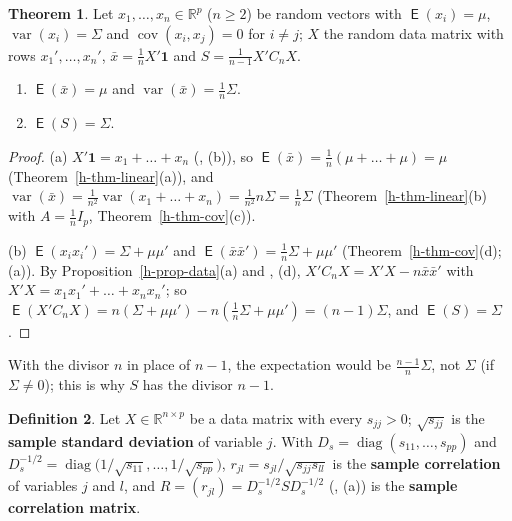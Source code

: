\documentclass[12pt]{article}
\newcommand{\R}{\mathbb R}
\newcommand{\one}{\mathbf 1}
\DeclareMathOperator{\diag}{diag}
\DeclareMathOperator\expc{\mathsf{E}}
\DeclareMathOperator\var{var}
\DeclareMathOperator\cov{cov}
\theoremstyle{definition}
\newtheorem{theorem}{Theorem}
\newtheorem{definition}[theorem]{Definition}
\begin{document}
\begin{theorem}\label{h-thm-sample}
Let \(x_1,\dots,x_n\in\R^p\) (\(n\geqslant2\)) be random vectors with \(\expc(x_i)=\mu\),
\(\var(x_i)=\Sigma\) and \(\cov(x_i,x_j)=0\) for \(i\ne j\); \(X\) the random data matrix with
rows \(x_1',\dots,x_n'\), \(\bar x=\frac1nX'\one\) and \(S=\frac1{n-1}X'C_nX\).
\begin{enumerate}
\item \(\expc(\bar x)=\mu\) and \(\var(\bar x)=\frac1n\Sigma\).
\item \(\expc(S)=\Sigma\).
\end{enumerate}
\end{theorem}
\begin{proof}
(a) \(X'\one=x_1+\dots+x_n\) (, (b)), so \(\expc(\bar x)=\frac1n(\mu+\dots+\mu)=\mu\)
(Theorem~\ref{h-thm-linear}(a)), and \(\var(\bar x)=\frac1{n^2}\var(x_1+\dots+x_n)
=\frac1{n^2}n\Sigma=\frac1n\Sigma\) (Theorem~\ref{h-thm-linear}(b) with \(A=\frac1nI_p\), Theorem~\ref{h-thm-cov}(c)).

(b) \(\expc(x_ix_i')=\Sigma+\mu\mu'\) and \(\expc(\bar x\bar x')=\frac1n\Sigma+\mu\mu'\)
(Theorem~\ref{h-thm-cov}(d); (a)). By Proposition~\ref{h-prop-data}(a) and , (d),
\(X'C_nX=X'X-n\bar x\bar x'\) with \(X'X=x_1x_1'+\dots+x_nx_n'\); so
\(\expc(X'C_nX)=n(\Sigma+\mu\mu')-n(\frac1n\Sigma+\mu\mu')=(n-1)\Sigma\), and \(\expc(S)=\Sigma\).
\end{proof}
With the divisor \(n\) in place of \(n-1\), the expectation would be \(\frac{n-1}n\Sigma\), not \(\Sigma\) (if
\(\Sigma\ne0\)); this is why \(S\) has the divisor \(n-1\).

\begin{definition}\label{b9.17}
Let \(X\in\R^{n\times p}\) be a data matrix with every \(s_{jj}>0\); \(\sqrt{s_{jj}}\) is the \textbf{sample standard
deviation} of variable \(j\). With \(D_s=\diag(s_{11},\dots,s_{pp})\) and
\(D_s^{-1/2}=\diag\bigl(1/\sqrt{s_{11}},\dots,1/\sqrt{s_{pp}}\bigr)\), \(r_{jl}=s_{jl}/\sqrt{s_{jj}s_{ll}}\) is the
\textbf{sample correlation} of variables \(j\) and \(l\), and \(R=(r_{jl})=D_s^{-1/2}SD_s^{-1/2}\) (,
(a)) is the \textbf{sample correlation matrix}.
\end{definition}
\end{document}
